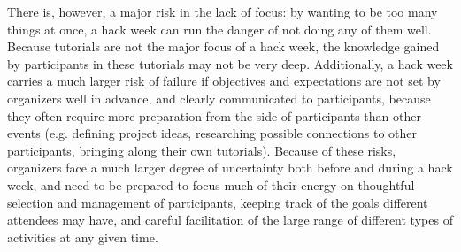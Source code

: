 There is, however, a major risk in the lack of focus: by wanting to be too many things at once, a hack week can run the danger of not doing any of them well. Because tutorials are not the major focus of a hack week, the knowledge gained by participants in these tutorials may not be very deep. Additionally, a hack week carries a much larger risk of failure if objectives and expectations are not set by organizers well in advance, and clearly communicated to participants, because they often require more preparation from the side of participants than other events (e.g. defining project ideas, researching possible connections to other participants, bringing along their own tutorials). 
Because of these risks, organizers face a much larger degree of uncertainty both before and during a hack week, and need to be prepared to focus much of their energy on thoughtful selection and management of participants, keeping track of the goals different attendees may have, and careful facilitation of the large range of different types of activities at any given time.




